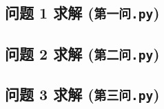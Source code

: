 \documentclass{ctexart}
\begin{document}
{\linespread{1}\selectfont

}

\subsection{问题 1 求解 (\normalfont\texttt{第一问.py})}
\label{app:q1}

{\linespread{1}\selectfont

}

\subsection{问题 2 求解 (\normalfont\texttt{第二问.py})}
\label{app:q2}

{\linespread{1}\selectfont

}

\subsection{问题 3 求解 (\normalfont\texttt{第三问.py})}
\label{app:q3}

{\linespread{1}\selectfont

}
\end{document}
